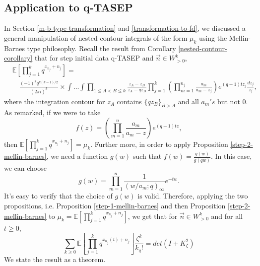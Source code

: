\subsection{Application to q-TASEP}
\label{mb-application-to-qtasep}
In Section \ref{m-b-type-transformation} and \ref{transformation-to-fd}, we discussed a general manipulation of nested contour integrals of the form $\mu_k$ using the Mellin-Barnes type philosophy. Recall the result from Corollary \ref{nested-contour-corollary} that for step initial data q-TASEP and $\vec{n} \in W^k_{>0}$, 
\begin{align*}
& \mathbb{E} \left[ \prod_{j=1}^k q^{x_{n_j}+n_j} \right] = \\
& \quad \frac{(-1)^k q^{k(k-1)/2}}{(2 \pi i)^k} \times \int \dots \int \prod_{1 \le A < B \le k} \frac{z_A - z_B}{z_A - qz_B} \prod_{j=1}^k \left( \prod_{m=1}^{n_j} \frac{a_m}{a_m - z_j}\right) e^{(q-1)tz_j} \frac{dz_j}{z_j},
\end{align*}
where the integration contour for $z_A$ contains $\{qz_B\}_{B > A}$ and all $a_m's$ but not $0$. As remarked, if we were to take $$f(z) = \left( \prod_{m=1}^{n} \frac{a_m}{a_m - z} \right) e^{(q-1)tz},$$ then $\mathbb{E} \left[ \prod_{j=1}^k q^{x_{n_j}+n_j} \right] = \mu_k$. Further more, in order to apply Proposition \ref{step-2-mellin-barnes}, we need a function $g(w)$ such that $f(w) = \frac{g(w)}{g(qw)}$. In this case, we can choose $$g(w) = \prod_{m=1}^{n} \frac{1}{(w/a_m; q)_{\infty}} e^{-tw}.$$ It's easy to verify that the choice of $g(w)$ is valid. Therefore, applying the two propositions, i.e. Proposition \ref{step-1-mellin-barnes} and then Proposition \ref{step-2-mellin-barnes} to $\mu_k = \mathbb{E} \left[ \prod_{j=1}^k q^{x_{n_j}+n_j} \right]$, we get that for $\vec{n} \in W^k_{>0}$ and for all $t \ge 0$,
\begin{equation}
\label{m-b-application-to-qtasep-raw}
\sum_{k \ge 0} \mathbb{E} \left[ \prod_{j=1}^k q^{x_{n_j}(t)+n_j} \right] \frac{\zeta^k}{k_q!} = det(I+K^2_{\zeta})
\end{equation}
We state the result as a theorem. 
